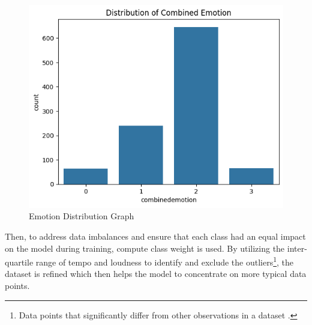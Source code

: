 \begin{figure}[ht!]
    \centering
    \includegraphics[width=14cm]{Images/emotion-distribution.png}
    \caption{Emotion Distribution Graph}
    \label{fig:box-plot}
\end{figure}
Then, to address data imbalances and ensure that each class had an equal impact on the model during training, compute class weight is used.
By utilizing the inter-quartile range of tempo and loudness to identify and exclude the outliers\footnote{Data points that significantly differ from other observations in a dataset \citep{bonthu_2021_detecting}.}, the dataset is refined which then helps the model to concentrate on more typical data points.

